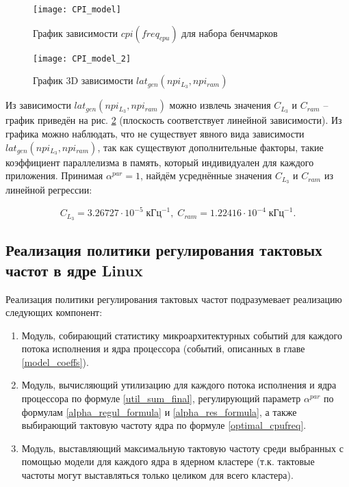     \begin{figure}[!h]
        \caption{График зависимости $cpi(freq_{cpu})$ для набора бенчмарков}
        \centering
        \texttt{[image: CPI\_model]}
        \label{pic:cpi_model}
    \end{figure}

    \begin{figure}[!h]
        \caption{График 3D зависимости $lat_{gen}(npi_{L_3}, npi_{ram})$}
        \centering
        \texttt{[image: CPI\_model\_2]}
        \label{pic:cpi_model_2}
    \end{figure}

    Из зависимости $lat_{gen}(npi_{L_3}, npi_{ram})$ можно извлечь значения $C_{L_3}$ и $C_{ram}$ --
    график приведён на рис. \ref{pic:cpi_model_2} (плоскость соответствует линейной
    зависимости). Из графика можно наблюдать, что не существует явного вида зависимости
    $lat_{gen}(npi_{L_3}, npi_{ram})$, так как существуют дополнительные факторы, такие коэффициент
    параллелизма в память, который индивидуален для каждого приложения. Принимая $\alpha^{par} = 1$,
    найдём усреднённые значения $C_{L_3}$ и $C_{ram}$ из линейной регрессии:

    \begin{equation}
        C_{L_3} = 3.26727 \cdot 10^{-5} \; \text{кГц}^{-1}, \; C_{ram} = 1.22416 \cdot 10^{-4} \; \text{кГц}^{-1}.
    \end{equation}

\subsection{Реализация политики регулирования тактовых частот в ядре Linux}

    Реализация политики регулирования тактовых частот подразумевает реализацию следующих компонент:
    \begin{enumerate}
        \item Модуль, собирающий статистику микроархитектурных событий для каждого потока исполнения
        и ядра процессора (событий, описанных в главе \ref{model_coeffs}).
        \item Модуль, вычисляющий утилизацию для каждого потока исполнения и ядра процессора по формуле
        \eqref{util_sum_final}, регулирующий параметр $\alpha^{par}$ по формулам \eqref{alpha_regul_formula}
        и \eqref{alpha_res_formula}, а также выбирающий тактовую частоту ядра по формуле
        \eqref{optimal_cpufreq}.
        \item Модуль, выставляющий максимальную тактовую частоту среди выбранных с помощью модели
        для каждого ядра в ядерном кластере (т.к. тактовые частоты могут выставляться только целиком
        для всего кластера).
    \end{enumerate}

